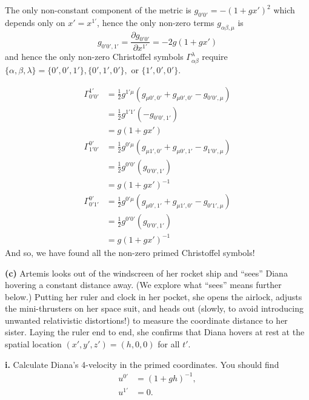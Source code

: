 \documentclass[a4paper]{article} %
\begin{document}
The only non-constant component of the metric is $g_{0'0'}=-(1+gx')^2$ which depends only on $x'=x^{1'}$, hence the only non-zero terms $g_{\alpha\beta,\mu}$ is
\begin{equation}
g_{0'0',1'}=\frac{\partial g_{0'0'}}{\partial x^{1'}}=-2g(1+gx')
\end{equation}
and hence the only non-zero Christoffel symbols $\Gamma^{\lambda}_{\alpha\beta}$ require $\{\alpha,\beta,\lambda\}=\{0',0',1'\}, \{0',1',0'\},$ or $\{1',0',0'\}$.

\begin{align}
\Gamma^{1'}_{0'0'}&=\frac{1}{2}g^{1' \mu}(g_{\mu 0',0'}+g_{\mu 0',0'}-g_{0'0',\mu})\\
&=\frac{1}{2}g^{1'1'} (-g_{0'0',1'})\\
&=g(1+gx')\\
\Gamma^{0'}_{1'0'}&=\frac{1}{2}g^{0' \mu}(g_{\mu 1',0'}+g_{\mu 0',1'}-g_{1'0',\mu})\\
&=\frac{1}{2}g^{0'0'}(g_{0'0',1'})\\
&=g(1+gx')^{-1}\\
\Gamma^{0'}_{0'1'}&=\frac{1}{2}g^{0' \mu}(g_{\mu 0',1'}+g_{\mu 1',0'}-g_{0'1',\mu})\\
&=\frac{1}{2}g^{0'0'}(g_{0'0',1'})\\
&=g(1+gx')^{-1}
\end{align}
And so, we have found all the non-zero primed Christoffel symbols!


\begin{framed}
\textbf{(c)} Artemis looks out of the windscreen of her rocket ship and “sees” Diana hovering a constant distance away. (We explore what “sees” means further below.) Putting her ruler and clock in her pocket, she opens the airlock, adjusts the mini-thrusters on her space suit, and heads out (slowly, to avoid introducing unwanted relativistic distortions!) to measure the coordinate distance to her sister. Laying the ruler end to end, she confirms that Diana hovers at rest at the spatial location $(x',y',z')=(h,0,0)$ for all $t'$.
\end{framed}

\begin{framed}
\textbf{i.} Calculate Diana’s 4-velocity in the primed coordinates. You should find
\begin{align}
u^{0'}&=(1+gh)^{-1},\label{ci. eq1}\\
u^{1'}&=0.\label{ci. eq2}
\end{align}
\end{framed}
\end{document}
